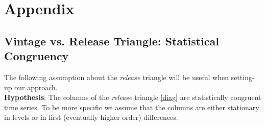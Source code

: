 \documentclass[11pt]{article}
\begin{document}
\section{Appendix}


\subsection{Vintage vs. Release Triangle: Statistical Congruency}\label{vrt}




The following assumption about the \emph{release} triangle will be useful when setting-up our approach.\\

\textbf{Hypothesis}: The columns of the \emph{release} triangle \ref{diag} are statistically congruent time series. To be more specific we assume that the columns are either stationary in levels or in first (eventually higher order) differences.\\
\end{document}

